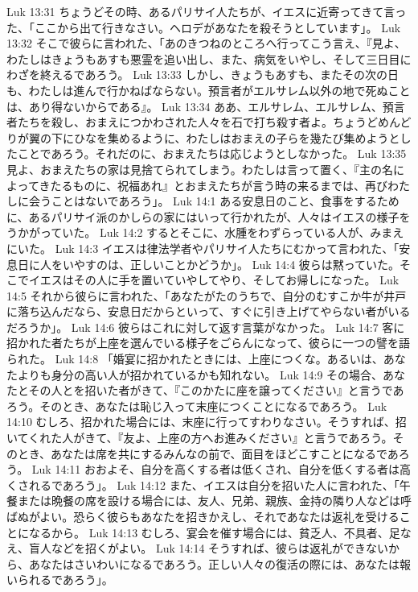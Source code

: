 Luk 13:31  ちょうどその時、あるパリサイ人たちが、イエスに近寄ってきて言った、「ここから出て行きなさい。ヘロデがあなたを殺そうとしています」。
Luk 13:32  そこで彼らに言われた、「あのきつねのところへ行ってこう言え、『見よ、わたしはきょうもあすも悪霊を追い出し、また、病気をいやし、そして三日目にわざを終えるであろう。
Luk 13:33  しかし、きょうもあすも、またその次の日も、わたしは進んで行かねばならない。預言者がエルサレム以外の地で死ぬことは、あり得ないからである』。
Luk 13:34  ああ、エルサレム、エルサレム、預言者たちを殺し、おまえにつかわされた人々を石で打ち殺す者よ。ちょうどめんどりが翼の下にひなを集めるように、わたしはおまえの子らを幾たび集めようとしたことであろう。それだのに、おまえたちは応じようとしなかった。
Luk 13:35  見よ、おまえたちの家は見捨てられてしまう。わたしは言って置く、『主の名によってきたるものに、祝福あれ』とおまえたちが言う時の来るまでは、再びわたしに会うことはないであろう」。
Luk 14:1  ある安息日のこと、食事をするために、あるパリサイ派のかしらの家にはいって行かれたが、人々はイエスの様子をうかがっていた。
Luk 14:2  するとそこに、水腫をわずらっている人が、みまえにいた。
Luk 14:3  イエスは律法学者やパリサイ人たちにむかって言われた、「安息日に人をいやすのは、正しいことかどうか」。
Luk 14:4  彼らは黙っていた。そこでイエスはその人に手を置いていやしてやり、そしてお帰しになった。
Luk 14:5  それから彼らに言われた、「あなたがたのうちで、自分のむすこか牛が井戸に落ち込んだなら、安息日だからといって、すぐに引き上げてやらない者がいるだろうか」。
Luk 14:6  彼らはこれに対して返す言葉がなかった。
Luk 14:7  客に招かれた者たちが上座を選んでいる様子をごらんになって、彼らに一つの譬を語られた。
Luk 14:8  「婚宴に招かれたときには、上座につくな。あるいは、あなたよりも身分の高い人が招かれているかも知れない。
Luk 14:9  その場合、あなたとその人とを招いた者がきて、『このかたに座を譲ってください』と言うであろう。そのとき、あなたは恥じ入って末座につくことになるであろう。
Luk 14:10  むしろ、招かれた場合には、末座に行ってすわりなさい。そうすれば、招いてくれた人がきて、『友よ、上座の方へお進みください』と言うであろう。そのとき、あなたは席を共にするみんなの前で、面目をほどこすことになるであろう。
Luk 14:11  おおよそ、自分を高くする者は低くされ、自分を低くする者は高くされるであろう」。
Luk 14:12  また、イエスは自分を招いた人に言われた、「午餐または晩餐の席を設ける場合には、友人、兄弟、親族、金持の隣り人などは呼ばぬがよい。恐らく彼らもあなたを招きかえし、それであなたは返礼を受けることになるから。
Luk 14:13  むしろ、宴会を催す場合には、貧乏人、不具者、足なえ、盲人などを招くがよい。
Luk 14:14  そうすれば、彼らは返礼ができないから、あなたはさいわいになるであろう。正しい人々の復活の際には、あなたは報いられるであろう」。
